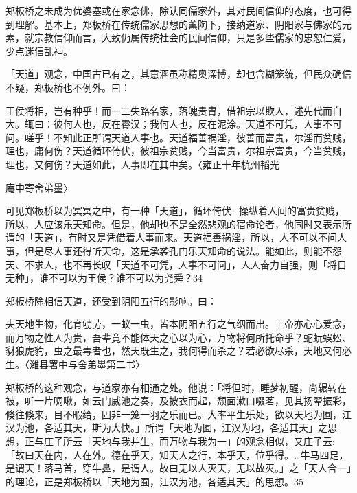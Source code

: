 
郑板桥之未成为优婆塞或在家念佛，除认同儒家外，其对民间信仰的态度，也可得到理解。基本上，郑板桥在传统儒家思想的薰陶下，接纳道家、阴阳家与佛家的元素，就宗教信仰而言，大致仍属传统社会的民间信仰，只是多些儒家的忠恕仁爱，少点迷信乱神。

「天道」观念，中国古已有之，其意涵虽称精奥深博，却也含糊笼统，但民众确信不疑，郑板桥也不例外。曰：

\begin{BookQuote}
王侯将相，岂有种乎！而一二失路名家，落魄贵胄，借祖宗以欺人，述先代而自大。辄曰：彼何人也，反在霄汉；我何人也，反在泥涂。天道不可凭，人事不可问。嗟乎！不知此正所谓天道人事也。天道福善祸淫，彼善而富贵，尔淫而贫贱，理也，庸何伤？天道循环倚伏，彼祖宗贫贱，今当富贵，尔祖宗富贵，今当贫贱，理也，又何伤？天道如此，人事即在其中矣。〈雍正十年杭州韬光
\end{BookQuote}

庵中寄舍弟墨〉

可见郑板桥以为冥冥之中，有一种「天道」，循环倚伏·操纵着人间的富贵贫贱，所以，人应该乐天知命。但是，他却也不是全然悲观的宿命论者，他同时又表示所谓的「天道」，有时又是凭借着人事而来。天道福善祸淫，所以，人不可以不问人事，但是尽人事还得听天命，这是承袭孔门乐天知命的说法。能如此，则能不怨天、不求人，也不再长叹「天道不可凭，人事不可问」，人人奋力自强，则「将目无种」，谁不可以为王侯？谁不可以为尧舜？34

\vfill
\begin{BookNotes}
\end{BookNotes}

郑板桥除相信天道，还受到阴阳五行的影响。曰：

\begin{BookQuote}
夫天地生物，化育劬劳，一蚁一虫，皆本阴阳五行之气𬘡而出。上帝亦心心爱念，而万物之性人为贵，吾辈竟不能体天之心以为心，万物将何所托命乎？蛇蚖蜈蚣、豺狼虎豹，虫之最毒者也，然天既生之，我何得而杀之？若必欲尽杀，天地又何必生。〈潍县署中与舍弟墨第二书〉
\end{BookQuote}

郑板桥的这种观念，与道家亦有相通之处。他说：「将但时，睡梦初醒，尚辗转在被，听一片啁啾，如云门威池之奏，及披衣而起，颓面漱口啜茗，见其扬翚振彩，倏往倏来，目不暇给，固非一笼一羽之乐而已。大率平生乐处，欲以天地为囿，江汉为池，各适其天，斯为大快。」所谓「天地为囿，江汉为地，各适其天」之思想，正与庄子所云「天地与我并生，而万物与我为一」的观念相似，又庄子云:「故曰天在内，人在外。德在乎天，知天人之行，本乎天，位乎得。…牛马四足，是谓天！落马首，穿牛鼻，是谓人。故曰无以人灭天，无以故灭。」之「天人合一」的理论，正是郑板桥以「天地为囿，江汉为池，各适其天」的思想。35

